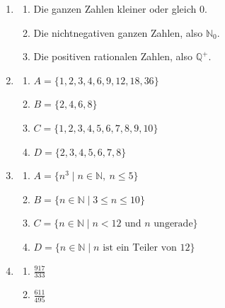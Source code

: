 \begin{enumerate}
    \item
          \begin{enumerate}
              \item Die ganzen Zahlen kleiner oder gleich \(0\).
              \item Die nichtnegativen ganzen Zahlen, also \(\mathbb{N}_0\).
              \item Die positiven rationalen Zahlen, also \(\mathbb{Q}^+\).
          \end{enumerate}

    \item
          \begin{enumerate}
              \item \(A = \{1,2,3,4,6,9,12,18,36\}\)
              \item \(B = \{2,4,6,8\}\)
              \item \(C = \{1,2,3,4,5,6,7,8,9,10\}\)
              \item \(D = \{2,3,4,5,6,7,8\}\)
          \end{enumerate}

    \item
          \begin{enumerate}
              \item \(A = \{n^3 \mid n \in \mathbb{N},\ n \leq 5\}\)
              \item \(B = \{n \in \mathbb{N} \mid 3 \leq n \leq 10\}\)
              \item \(C = \{n \in \mathbb{N} \mid n < 12 \text{ und } n \text{ ungerade}\}\)
              \item \(D = \{n \in \mathbb{N} \mid n \text{ ist ein Teiler von } 12\}\)
          \end{enumerate}

    \item \begin{enumerate}
              \item \(\frac{917}{333}\)
              \item \(\frac{611}{495}\)
          \end{enumerate}


\end{enumerate}
